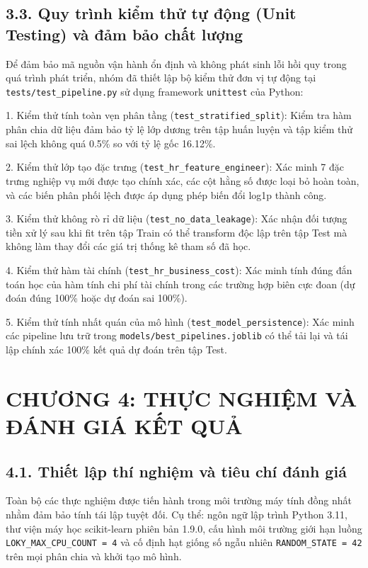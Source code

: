\documentclass[12pt,a4paper]{article}
\begin{document}
\subsection{3.3. Quy trình kiểm thử tự động (Unit Testing) và đảm bảo chất lượng}
Để đảm bảo mã nguồn vận hành ổn định và không phát sinh lỗi hồi quy trong quá trình phát triển, nhóm đã thiết lập bộ kiểm thử đơn vị tự động tại \texttt{tests/test\_pipeline.py} sử dụng framework \texttt{unittest} của Python:

1. Kiểm thử tính toàn vẹn phân tầng (\texttt{test\_stratified\_split}): Kiểm tra hàm phân chia dữ liệu đảm bảo tỷ lệ lớp dương trên tập huấn luyện và tập kiểm thử sai lệch không quá 0.5\% so với tỷ lệ gốc 16.12\%.

2. Kiểm thử lớp tạo đặc trưng (\texttt{test\_hr\_feature\_engineer}): Xác minh 7 đặc trưng nghiệp vụ mới được tạo chính xác, các cột hằng số được loại bỏ hoàn toàn, và các biến phân phối lệch được áp dụng phép biến đổi log1p thành công.

3. Kiểm thử không rò rỉ dữ liệu (\texttt{test\_no\_data\_leakage}): Xác nhận đối tượng tiền xử lý sau khi fit trên tập Train có thể transform độc lập trên tập Test mà không làm thay đổi các giá trị thống kê tham số đã học.

4. Kiểm thử hàm tài chính (\texttt{test\_hr\_business\_cost}): Xác minh tính đúng đắn toán học của hàm tính chi phí tài chính trong các trường hợp biên cực đoan (dự đoán đúng 100\% hoặc dự đoán sai 100\%).

5. Kiểm thử tính nhất quán của mô hình (\texttt{test\_model\_persistence}): Xác minh các pipeline lưu trữ trong \texttt{models/best\_pipelines.joblib} có thể tải lại và tái lập chính xác 100\% kết quả dự đoán trên tập Test.


\newpage
\section{CHƯƠNG 4: THỰC NGHIỆM VÀ ĐÁNH GIÁ KẾT QUẢ}

\subsection{4.1. Thiết lập thí nghiệm và tiêu chí đánh giá}
Toàn bộ các thực nghiệm được tiến hành trong môi trường máy tính đồng nhất nhằm đảm bảo tính tái lập tuyệt đối. Cụ thể: ngôn ngữ lập trình Python 3.11, thư viện máy học scikit-learn phiên bản 1.9.0, cấu hình môi trường giới hạn luồng \texttt{LOKY\_MAX\_CPU\_COUNT = 4} và cố định hạt giống số ngẫu nhiên \texttt{RANDOM\_STATE = 42} trên mọi phân chia và khởi tạo mô hình.
\end{document}
